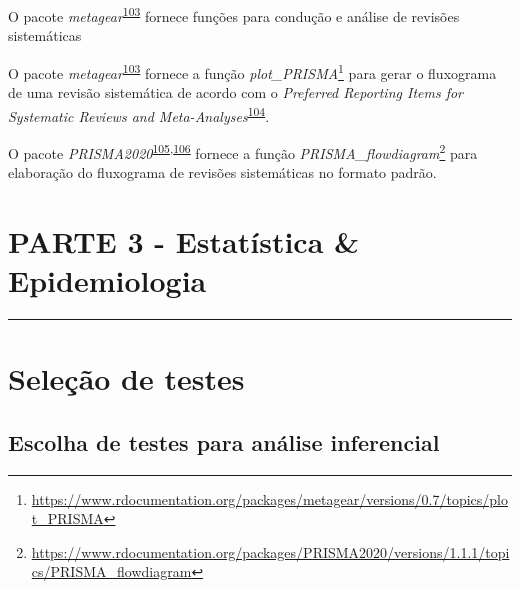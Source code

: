 \documentclass[
]{book}
\renewcommand{\href}[2]{#2\footnote{\url{#1}}}
\newenvironment{infobox}[1]
  {
  \begin{itemize}
  \renewcommand{\labelitemi}{
    \raisebox{-.7\height}[0pt][0pt]{
      {\setkeys{Gin}{width=3em,keepaspectratio}
        \texttt{[image: \#1]}}
    }
  }
  \setlength{\fboxsep}{1em}
  \begin{blackbox}
  \item
  }
  {
  \end{blackbox}
  \end{itemize}
  }
\begin{document}
\begin{infobox}{images/Rlogo}
O pacote \emph{metagear}\textsuperscript{\protect\hyperlink{ref-metagear}{103}} fornece funções para condução e análise de revisões sistemáticas

\end{infobox}

\begin{infobox}{images/Rlogo}
O pacote \emph{metagear}\textsuperscript{\protect\hyperlink{ref-metagear}{103}} fornece a função \href{https://www.rdocumentation.org/packages/metagear/versions/0.7/topics/plot_PRISMA}{\emph{plot\_PRISMA}} para gerar o fluxograma de uma revisão sistemática de acordo com o \emph{Preferred Reporting Items for Systematic Reviews and Meta-Analyses}\textsuperscript{\protect\hyperlink{ref-Moher2015}{104}}.

\end{infobox}

\begin{infobox}{images/Rlogo}
O pacote \emph{PRISMA2020}\textsuperscript{\protect\hyperlink{ref-PRISMA2020-2}{105},\protect\hyperlink{ref-PRISMA2020}{106}} fornece a função \href{https://www.rdocumentation.org/packages/PRISMA2020/versions/1.1.1/topics/PRISMA_flowdiagram}{\emph{PRISMA\_flowdiagram}} para elaboração do fluxograma de revisões sistemáticas no formato padrão.

\end{infobox}


\hypertarget{parte-3---estatuxedstica-epidemiologia}{%
\chapter*{\texorpdfstring{\textbf{PARTE 3 - Estatística \& Epidemiologia}}{PARTE 3 - Estatística \& Epidemiologia}}\label{parte-3---estatuxedstica-epidemiologia}}

\markboth{}{}
\par\noindent\rule{\textwidth}{0.05in}

\hypertarget{selecao-testes}{%
\chapter{\texorpdfstring{\textbf{Seleção de testes}}{Seleção de testes}}\label{selecao-testes}}

\hypertarget{escolha-analise-inferencial}{%
\section{Escolha de testes para análise inferencial}\label{escolha-analise-inferencial}}
\end{document}
